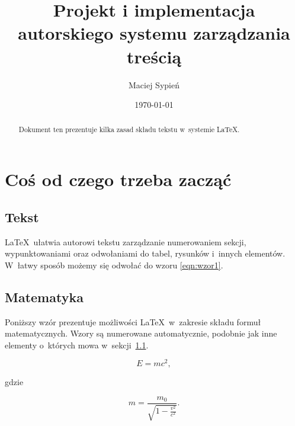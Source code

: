 \documentclass[12pt, oneside, a4paper, franc]{report}
\title{Projekt i implementacja autorskiego systemu zarządzania treścią}
\author{Maciej Sypień}
\date{\today}
\begin{document}
\begin{abstract}
Dokument ten prezentuje kilka zasad składu tekstu w~systemie \LaTeX. 
\end{abstract}

\chapter{Coś od czego trzeba zacząć}

\section{Tekst}\label{sec:tekst}
\LaTeX\ ułatwia autorowi tekstu zarządzanie numerowaniem sekcji, wypunktowaniami oraz odwołaniami do tabel, rysunków i~innych elementów. W~łatwy sposób możemy się odwołać do wzoru \ref{eqn:wzor1}.

\section{Matematyka}\label{sec:matematyka}
Poniższy wzór prezentuje możliwości \LaTeX\ w~zakresie składu formuł matematycznych. Wzory są numerowane automatycznie, podobnie jak inne elementy o~których mowa w~sekcji~\ref{sec:tekst}.

\begin{equation}
    E = mc^2,
    \label{eqn:wzor1}
\end{equation}

gdzie

\begin{equation}
    m = \frac{m_0}{\sqrt{1-\frac{v^2}{c^2}}}.
\end{equation}
\end{document}
